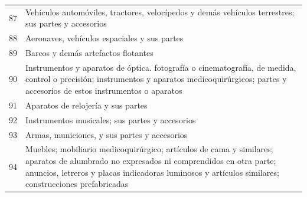 \documentclass[a4paper,openright,12pt]{book}
\begin{document}
\begin{table}[]
{\begin{tabular}{@{}ll@{}}
87  & Vehículos automóviles, tractores, velocípedos y demás vehículos terrestres; sus partes y accesorios                                                                                                                                                                                            \\
88  & Aeronaves, vehículos espaciales y sus partes                                                                                                                                                                                                                                                   \\
89  & Barcos y demás artefactos flotantes                                                                                                                                                                                                                                                            \\
90  & Instrumentos y aparatos de óptica. fotografía o cinematografía, de medida, control o precisión; instrumentos y aparatos medicoquirúrgicos; partes y accesorios de estos instrumentos o aparatos                                                                                                \\
91  & Aparatos de relojería y sus partes                                                                                                                                                                                                                                                             \\
92  & Instrumentos musicales; sus partes y accesorios                                                                                                                                                                                                                                                \\
93  & Armas, municiones, y sus partes y accesorios                                                                                                                                                                                                                                                   \\
94  & Muebles; mobiliario medicoquirúrgico; artículos de cama y similares; aparatos de alumbrado no expresados ni comprendidos en otra parte; anuncios, letreros y placas indicadoras luminosos y artículos similares; construcciones prefabricadas                                                  \\

\end{tabular}}
\end{table}
\end{document}
